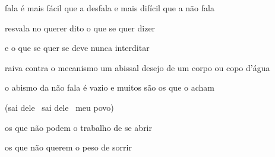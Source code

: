\begin{poem}
\begin{stanza}
fala\verseline
é mais fácil\verseline
que a desfala\verseline
e mais difícil\verseline
que a não fala
\end{stanza}
\begin{stanza}
resvala no\verseline
querer dito\verseline
o que se\verseline
quer dizer
\end{stanza}
\begin{stanza}
e o que\verseline
se quer\verseline
se deve\verseline
nunca\verseline
interditar
\end{stanza}
\begin{stanza}
raiva\verseline
contra o mecanismo\verseline
um abissal\verseline
desejo\verseline
de um corpo\verseline
ou copo\verseline
d'água
\end{stanza}
\begin{stanza}
o abismo\verseline
da não fala\verseline
é vazio\verseline
e muitos são\verseline
os que o acham
\end{stanza}
\begin{stanza}
(sai dele\verseline
\ sai dele\verseline
\ meu povo)
\end{stanza}
\begin{stanza}
os que não\verseline
podem\verseline
o trabalho\verseline
de se abrir
\end{stanza}
\begin{stanza}
os que não\verseline
querem\verseline
o peso\verseline
de sorrir
\end{stanza}
\end{poem}